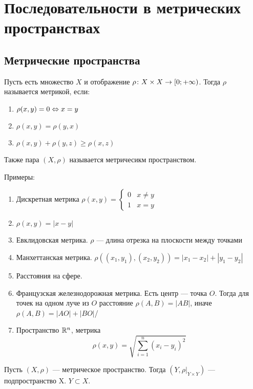 \chapter[Посл-ти в метрических пространствах]{Последовательности в метрических пространствах}

\section{Метрические пространства}

\begin{Def}
Пусть есть множество $X$ и отображение $\rho \colon X \times X \rightarrow \left[0; +\infty\right) $. Тогда $\rho$ называется метрикой, если:
\begin{enumerate}
\item $\rho(x, y) = 0 \Leftrightarrow x = y$
\item $\rho(x, y) = \rho(y, x)$
\item $\rho(x, y) + \rho(y, z) \geqslant \rho(x, z)$
\end{enumerate} 
Также пара $(X, \rho)$ называется метричесикм пространством.
\end{Def}

Примеры:
\begin{enumerate}
\item Дискретная метрика
$\rho(x, y) = \begin{cases}0 & x \ne y \\ 1 & x = y\end{cases}$
\item $\rho(x, y) = \left|x - y\right|$
\item Евклидовская метрика. $\rho$ --- длина отрезка на плоскости между точками
\item Манхеттанская метрика. $\rho\left((x_1, y_1), (x_2, y_2)\right) = |x_1 - x_2| + |y_1 - y_2|$
\item Расстояния на сфере.
\item Французская железнодорожная метрика. Есть центр --- точка $O$. Тогда для точек на одном луче из $O$ расстояние $\rho(A, B) = |AB|$, иначе $\rho(A, B) = |AO| + |BO|$/
\item Пространство $\mathbb{R}^n$, метрика $$\rho(x, y) = \sqrt{\sum_{i=1}^n \left(x_i-y_i\right)^2}$$
\end{enumerate}

\begin{Def}
Пусть $(X, \rho)$ --- метрическое пространство. Тогда $(Y, \rho|_{Y \times Y})$ --- подпространство X. $Y \subset X$.
\end{Def}


